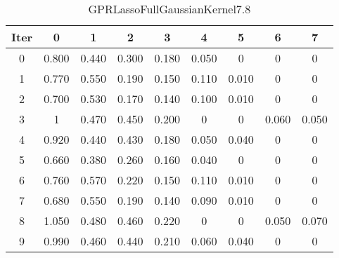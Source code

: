 \begin{table}
	\begin{center}
		\begin{tabular}{|c|c|c|c|c|c|c|c|c|}
			\hline
			Iter & 0 & 1 & 2 & 3 & 4 & 5 & 6 & 7 \\
			\hline
			0 & 0.800 & 0.440 & 0.300 & 0.180 & 0.050 & 0 & 0 & 0 \\
			\hline
			1 & 0.770 & 0.550 & 0.190 & 0.150 & 0.110 & 0.010 & 0 & 0 \\
			\hline
			2 & 0.700 & 0.530 & 0.170 & 0.140 & 0.100 & 0.010 & 0 & 0 \\
			\hline
			3 & 1 & 0.470 & 0.450 & 0.200 & 0 & 0 & 0.060 & 0.050 \\
			\hline
			4 & 0.920 & 0.440 & 0.430 & 0.180 & 0.050 & 0.040 & 0 & 0 \\
			\hline
			5 & 0.660 & 0.380 & 0.260 & 0.160 & 0.040 & 0 & 0 & 0 \\
			\hline
			6 & 0.760 & 0.570 & 0.220 & 0.150 & 0.110 & 0.010 & 0 & 0 \\
			\hline
			7 & 0.680 & 0.550 & 0.190 & 0.140 & 0.090 & 0.010 & 0 & 0 \\
			\hline
			8 & 1.050 & 0.480 & 0.460 & 0.220 & 0 & 0 & 0.050 & 0.070 \\
			\hline
			9 & 0.990 & 0.460 & 0.440 & 0.210 & 0.060 & 0.040 & 0 & 0 \\
			\hline
		\end{tabular}
	\end{center}
	\caption{GPRLassoFullGaussianKernel7.8}
\end{table}